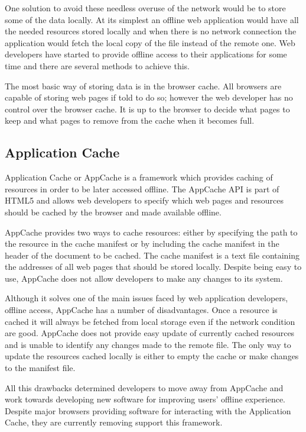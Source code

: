 \documentclass[10pt,a4paper,twoside]{book}
\begin{document}
One solution to avoid these needless overuse of the network would be to store some of the data locally. At its simplest an offline web application would have all the needed resources stored locally and when there is no network connection the application would fetch the local copy of the file instead of the remote one.  Web developers have started to provide offline access to their applications for some time and there are several methods to achieve this.

The most basic way of storing data is in the browser cache. All browsers are capable of storing web pages if told to do so; however the web developer has no control over the browser cache. It is up to the browser to decide what pages to keep and what pages to remove from the cache when it becomes full. 

\subsection{Application Cache}

Application Cache or AppCache is a framework which provides caching of resources in order to be later accessed offline. The AppCache API is part of HTML5 and allows web developers to specify which web pages and resources should be cached by the browser and made available offline.

AppCache provides two ways to cache resources: either by specifying the path to the resource in the cache manifest or by including the cache manifest in the header of the document to be cached. The cache manifest is a text file containing the addresses of all web pages that should be stored locally. Despite being easy to use, AppCache does not allow developers to make any changes to its system. 

Although it solves one of the main issues faced by web application developers, offline access, AppCache has a number of disadvantages. Once a resource is cached it will always be fetched from local storage even if the network condition are good. AppCache does not provide easy update of currently cached resources and is unable to identify any changes made to the remote file. The only way to update the resources cached locally is either to empty the cache or make changes to the manifest file.

All this drawbacks determined developers to move away from AppCache and work towards developing new software for improving users' offline experience. Despite major browsers providing software for interacting with the Application Cache, they are currently removing support this framework.
\end{document}
